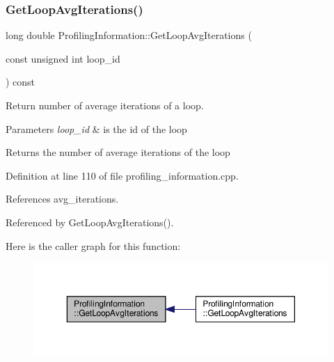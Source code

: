 \subsubsection{\texorpdfstring{Get\+Loop\+Avg\+Iterations()}{GetLoopAvgIterations()}\hspace{0.1cm}{\footnotesize\ttfamily [1/2]}}
{\footnotesize\ttfamily long double Profiling\+Information\+::\+Get\+Loop\+Avg\+Iterations (\begin{DoxyParamCaption}\item[{const unsigned int}]{loop\+\_\+id }\end{DoxyParamCaption}) const}



Return number of average iterations of a loop. 


\begin{DoxyParams}{Parameters}
{\em loop\+\_\+id} & is the id of the loop \\
\hline
\end{DoxyParams}
\begin{DoxyReturn}{Returns}
the number of average iterations of the loop 
\end{DoxyReturn}


Definition at line 110 of file profiling\+\_\+information.\+cpp.



References avg\+\_\+iterations.



Referenced by Get\+Loop\+Avg\+Iterations().

Here is the caller graph for this function\+:
\nopagebreak
\begin{figure}[H]
\begin{center}
\leavevmode
\includegraphics[width=350pt]{dd/d5b/classProfilingInformation_a6c467f30b1822b93d25212619d868377_icgraph}
\end{center}
\end{figure}
\mbox{\label{classProfilingInformation_a29fb3019434a6b893e554dfd8438076f}} 

